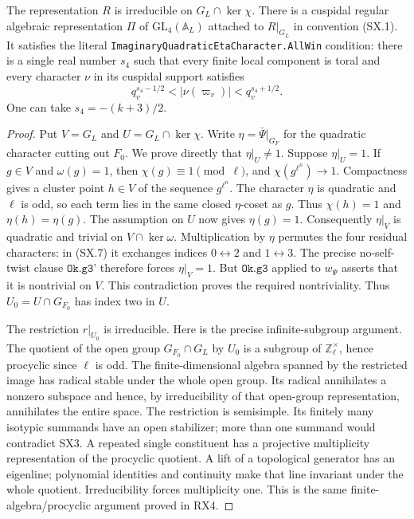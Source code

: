 \begin{proposition}
\label{claim:SX6}
The representation $R$ is irreducible on
$G_L\cap\ker\chi$.  There is a cuspidal regular algebraic
representation $\Pi$ of $\mathrm{GL}_4(\mathbb A_L)$ attached
to $R|_{G_L}$ in convention (SX.1).  It satisfies the literal
\texttt{ImaginaryQuadraticEtaCharacter.\allowbreak AllWin} condition:
there is a single real number $s_4$ such that every finite local
component is toral and every character $\nu$ in its cuspidal
support satisfies
\[
 q_v^{s_4-1/2}<|\nu(\varpi_v)|<q_v^{s_4+1/2}.
                                                            \tag{SX.26}
\]
One can take $s_4=-(k+3)/2$.
\end{proposition}
\begin{proof}
Put $V=G_L$ and $U=G_L\cap\ker\chi$.
Write $\eta=\bar\Psi|_{G_F}$ for the quadratic character
cutting out $F_0$.  We prove directly that $\eta|_U\ne1$.
Suppose $\eta|_U=1$.  If $g\in V$ and $\omega(g)=1$,
then $\chi(g)\equiv1\pmod\ell$, and
$\chi(g^{\ell^n})\longrightarrow1$.
Compactness gives a cluster point $h\in V$ of the sequence
$g^{\ell^n}$.  The character $\eta$ is quadratic and $\ell$
is odd, so each term lies in the same closed $\eta$-coset
as $g$.  Thus $\chi(h)=1$ and $\eta(h)=\eta(g)$.
The assumption on $U$ now gives $\eta(g)=1$.
Consequently $\eta|_V$ is quadratic and trivial on
$V\cap\ker\omega$.  Multiplication by $\eta$ permutes the
four residual characters: in (SX.7) it exchanges indices
$0\leftrightarrow2$ and $1\leftrightarrow3$.
The precise no-self-twist clause $\texttt{Ok.g3'}$ therefore
forces $\eta|_V=1$.  But $\texttt{Ok.g3}$ applied to
$w_\Psi$ asserts that it is nontrivial on $V$.
This contradiction proves the required nontriviality.
Thus $U_0=U\cap G_{F_0}$ has index two in $U$.

The restriction $r|_{U_0}$ is irreducible.  Here is the precise
infinite-subgroup argument.  The quotient of the open group
$G_{F_0}\cap G_L$ by $U_0$ is a subgroup of
$\mathbb Z_\ell^\times$, hence procyclic since $\ell$ is odd.
The finite-dimensional algebra spanned by the restricted image
has radical stable under the whole open group.  Its radical
annihilates a nonzero subspace and hence, by irreducibility of
that open-group representation, annihilates the entire space.
The restriction is semisimple.  Its finitely many isotypic
summands have an open stabilizer; more than one summand would
contradict SX3.  A repeated single constituent has a projective
multiplicity representation of the procyclic quotient.
A lift of a topological generator has an eigenline; polynomial
identities and continuity make that line invariant under the
whole quotient.  Irreducibility forces multiplicity one.
This is the same finite-algebra/procyclic argument proved in RX4.


\end{proof}
